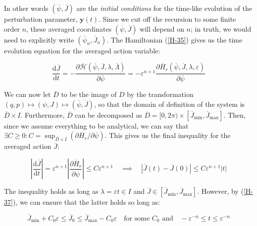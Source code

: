 In other words $(\overline{\psi},\overline{J})$ are the \textit{initial conditions} for the time-like evolution of the perturbation parameter, $\mathbf{y}(t)$. Since we cut off the recursion to some finite order $n$, these averaged coordinates $(\overline{\psi},\overline{J})$ will depend on $n$; in truth, we would need to explicitly write $(\overline{\psi}_n,\overline{J}_n)$. The Hamiltonian (\ref{H-35}) gives us the time evolution equation for the averaged action variable:

\begin{equation}
    \frac{\mathrm{d}\overline{J}}{\mathrm{d}t}=-\frac{\partial\overline{\mathcal{H}}(\overline{\psi},\overline{J},\lambda,\overline{\Lambda})}{\partial \overline{\psi}}=-\varepsilon^{n+1}\frac{\partial \overline{H}_r(\overline{\psi},\overline{J},\lambda,\varepsilon)}{\partial \overline{\psi}}
\end{equation}

We can now let $\overline{D}$ to be the image of $D$ by the transformation $(q,p)\mapsto(\psi, J)\mapsto(\overline{\psi},\overline{J})$, so that the domain of definition of the system is $\overline{D}\times I$. Furthermore, $\overline{D}$ can be decomposed as $\overline{D}=[0,2\pi)\times[\overline{J}_\text{min},\overline{J}_\text{max}]$. Then, since we assume everything to be analytical, we can say that $\exists C\geq 0:C=\sup_{\overline{D}\times I}\left(\partial\overline{H}_r/\partial\overline{\psi}\right)$. This gives us the final inequality for the averaged action $\overline{J}$:

\begin{equation}
    \label{H-37}
    \left|\frac{\mathrm{d}\overline{J}}{\mathrm{d}t}\right|=\varepsilon^{n+1}\left|\frac{\partial \overline{H}_r}{\partial \overline{\psi}}\right|\leq C \varepsilon^{n+1}\quad\implies\quad \left|\overline{J}(t)-\overline{J}(0)\right|\leq C \varepsilon^{n+1}|t|
\end{equation}

The inequality holds as long as $\lambda=\varepsilon t\in I$ and $\overline{J}\in[\overline{J}_\text{min},\overline{J}_\text{max}]$. However, by (\ref{H-37}), we can ensure that the latter holds so long as:

\begin{equation}
    \overline{J}_\text{min}+C_0 \varepsilon\leq \overline{J}_0 \leq \overline{J}_\text{max}-C_0 \varepsilon\quad\text{for some }C_0\text{ and}\quad -\varepsilon^{-n}\leq t \leq \varepsilon^{-n}
\end{equation}

